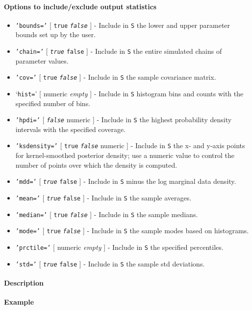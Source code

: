  \paragraph{Options to include/exclude output statistics}
 
 \begin{itemize}
 \item
   \texttt{'bounds='} {[} \texttt{true} \textbar{} \emph{\texttt{false}}
   {]} - Include in \texttt{S} the lower and upper parameter bounds set
   up by the user.
 \item
   \texttt{'chain='} {[} \emph{\texttt{true}} \textbar{} \texttt{false}
   {]} - Include in \texttt{S} the entire simulated chains of parameter
   values.
 \item
   \texttt{'cov='} {[} \texttt{true} \textbar{} \emph{\texttt{false}} {]}
   - Include in \texttt{S} the sample covariance matrix.
 \item
   `\texttt{hist=}' {[} numeric \textbar{} \emph{empty} {]} - Include in
   \texttt{S} histogram bins and counts with the specified number of
   bins.
 \item
   \texttt{'hpdi='} {[} \emph{\texttt{false}} \textbar{} numeric {]} -
   Include in \texttt{S} the highest probability density intervals with
   the specified coverage.
 \item
   \texttt{'ksdensity='} {[} \texttt{true} \textbar{}
   \emph{\texttt{false}} \textbar{} numeric {]} - Include in \texttt{S}
   the x- and y-axis points for kernel-smoothed posterior density; use a
   numeric value to control the number of points over which the density
   is computed.
 \item
   \texttt{'mdd='} {[} \emph{\texttt{true}} \textbar{} \texttt{false} {]}
   - Include in \texttt{S} minus the log marginal data density.
 \item
   \texttt{'mean='} {[} \emph{\texttt{true}} \textbar{} \texttt{false}
   {]} - Include in \texttt{S} the sample averages.
 \item
   \texttt{'median='} {[} \texttt{true} \textbar{} \emph{\texttt{false}}
   {]} - Include in \texttt{S} the sample medians.
 \item
   \texttt{'mode='} {[} \texttt{true} \textbar{} \emph{\texttt{false}}
   {]} - Include in \texttt{S} the sample modes based on histograms.
 \item
   \texttt{'prctile='} {[} numeric \textbar{} \emph{empty} {]} - Include
   in \texttt{S} the specified percentiles.
 \item
   \texttt{'std='} {[} \emph{\texttt{true}} \textbar{} \texttt{false} {]}
   - Include in \texttt{S} the sample std deviations.
 \end{itemize}
 
 \paragraph{Description}
 
 \paragraph{Example}


